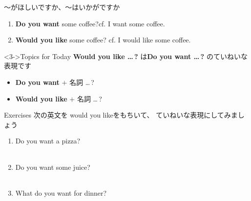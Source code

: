 \documentclass[aspectratio=169,xcolor={dvipsnames,table}]{beamer}
\begin{document}
\begin{frame}[plain]{～がほしいですか、～はいかがですか}
\large
 \begin{enumerate}
  \item<1-> \textbf{Do you want} some coffee?\hfill{\scriptsize cf. I want some coffee.}
  \item<2-> \textbf{Would you like} some coffee? \hfill{\scriptsize cf. I would like some coffee.}
 \end{enumerate}

\bigskip

\begin{block}<3->{Topics for Today}\small
\textbf{Would you like \ldots\,?}\,\,は\textbf{Do you want \ldots\,?}\,\,のていねいな表現です
\begin{itemize}[square]\small
 \item \textbf{Do you want} $+$ 名詞 \ldots\,?
 \item \textbf{Would you like} $+$ 名詞 \ldots\,?
       \end{itemize}
\end{block}
\hfill{\scriptsize {}}

\end{frame}
\begin{frame}[plain]{Exercises}
次の英文を would you likeをもちいて、 ていねいな表現にしてみましょう
 \begin{enumerate}
  \item Do you want a pizza?\\
\\
  \item Do you want some juice?\\
\\
  \item What do you want for dinner?\\
\\
 \end{enumerate}

\hfill{\scriptsize {}}

\end{frame}
\end{document}
